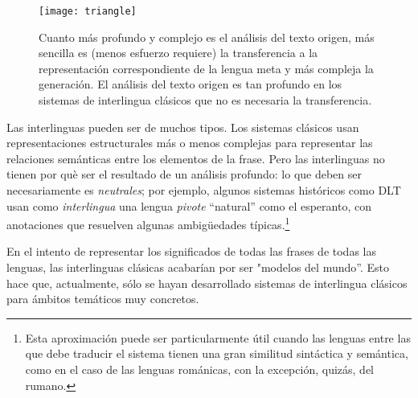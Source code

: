 \begin{figure} \begin{center} \texttt{[image: triangle]} \end{center} \caption{Cuanto más profundo y complejo es el análisis del texto origen, más sencilla es (menos esfuerzo requiere) la transferencia a la representación correspondiente de la lengua meta y más compleja la generación. El análisis del texto origen es tan profundo en los sistemas de interlingua clásicos que no es necesaria la transferencia.} \label{fg:triangle} \end{figure} 

Las interlinguas pueden ser de muchos tipos. Los sistemas clásicos usan representaciones estructurales más o menos complejas para representar las relaciones semánticas entre los elementos de la frase. 
Pero las interlinguas no tienen por què ser el resultado de un análisis profundo: lo que deben ser necesariamente es \emph{neutrales}; por ejemplo, algunos sistemas históricos como DLT \citep[cap.~17]{hutchins92b} usan como \emph{interlingua} una lengua \emph{pivote} ``natural'' como el esperanto, con anotaciones que resuelven algunas ambigüedades típicas.\footnote{Esta aproximación puede ser particularmente útil cuando las lenguas entre las que debe traducir el sistema tienen una gran similitud sintáctica y semántica, como en el caso de las lenguas románicas, con la excepción, quizás, del rumano.} 

En el intento de representar los significados de todas las frases de todas las lenguas, las interlinguas clásicas acabarían por ser "modelos del mundo''. Esto hace que, actualmente, sólo se hayan desarrollado sistemas de interlingua clásicos para ámbitos temáticos muy concretos. 

